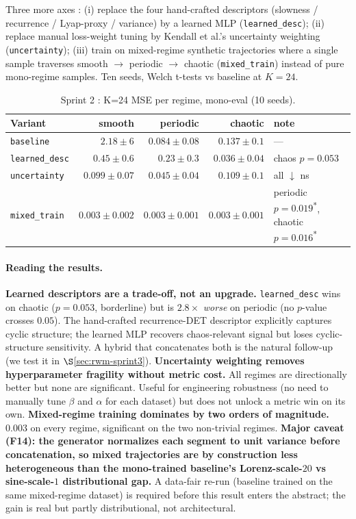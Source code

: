 \documentclass[11pt,a4paper]{article}
\begin{document}
Three more axes : (i) replace the four hand-crafted descriptors
(slowness / recurrence / Lyap-proxy / variance) by a learned MLP
(\texttt{learned\_desc}); (ii) replace manual loss-weight tuning by
Kendall et al.'s uncertainty weighting \cite{kendall2018multitask}
(\texttt{uncertainty}); (iii) train on mixed-regime synthetic
trajectories where a single sample traverses smooth $\to$ periodic
$\to$ chaotic (\texttt{mixed\_train}) instead of pure mono-regime
samples. Ten seeds, Welch t-tests vs baseline at $K{=}24$.

\begin{table}[h]
\centering
\caption{Sprint 2 : K=24 MSE per regime, mono-eval (10 seeds).}
\label{tab:sprint2-summary}
\begin{tabular}{lrrrl}
\toprule
Variant & smooth & periodic & chaotic & note \\
\midrule
\texttt{baseline}     & $2.18 \pm 6$       & $0.084 \pm 0.08$    & $0.137 \pm 0.1$    & — \\
\texttt{learned\_desc}& $0.45 \pm 0.6$     & $0.23 \pm 0.3$      & $\bm{0.036 \pm 0.04}$ & chaos $p{=}0.053$ \\
\texttt{uncertainty}  & $0.099 \pm 0.07$   & $0.045 \pm 0.04$    & $0.109 \pm 0.1$    & all $\downarrow$ ns \\
\texttt{mixed\_train} & $\bm{0.003 \pm 0.002}$ & $\bm{0.003 \pm 0.001}$ & $\bm{0.003 \pm 0.001}$ & periodic $p{=}0.019$\textsuperscript{*}, chaotic $p{=}0.016$\textsuperscript{*} \\
\bottomrule
\end{tabular}
\end{table}

\paragraph{Reading the results.}
\textbf{Learned descriptors are a trade-off, not an upgrade.}
\texttt{learned\_desc} wins on chaotic ($p{=}0.053$, borderline)
but is $2.8{\times}$ \emph{worse} on periodic (no $p$-value crosses
$0.05$). The hand-crafted recurrence-DET descriptor explicitly
captures cyclic structure; the learned MLP recovers chaos-relevant
signal but loses cyclic-structure sensitivity. A hybrid that
concatenates both is the natural follow-up (we test it in
$\S$\ref{sec:rwm-sprint3}).
\textbf{Uncertainty weighting removes hyperparameter fragility
without metric cost.} All regimes are directionally better but
none are significant. Useful for engineering robustness (no need
to manually tune $\beta$ and $\alpha$ for each dataset) but does
not unlock a metric win on its own.
\textbf{Mixed-regime training dominates by two orders of magnitude.}
$0.003$ on every regime, significant on the two non-trivial
regimes. \textbf{Major caveat (F14): the generator normalizes
each segment to unit variance before concatenation, so mixed
trajectories are by construction less heterogeneous than the
mono-trained baseline's Lorenz-scale-$20$ vs sine-scale-$1$
distributional gap.} A data-fair re-run (baseline trained on the
same mixed-regime dataset) is required before this result enters
the abstract; the gain is real but partly distributional, not
architectural.
\end{document}
